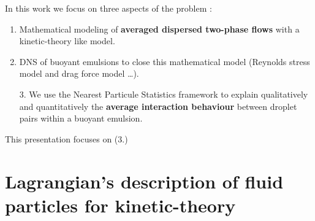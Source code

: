 \documentclass{sintefbeamer}
\begin{document}
\begin{frame}
  {In this work we focus on three aspects of the problem :}
  \Large
  \begin{enumerate}
    \item Mathematical modeling of \textbf{averaged dispersed two-phase flows} with a kinetic-theory like model. 

    \item DNS of buoyant emulsions to close this mathematical model (Reynolds stress model and drag force model \ldots). 
    \item[3.] We use the Nearest Particule Statistics framework to explain qualitatively and quantitatively the \textbf{average interaction behaviour} between droplet pairs within a buoyant emulsion. 
  \end{enumerate}
  This presentation focuses on (3.)
\end{frame}



\section{Lagrangian's description of fluid particles for kinetic-theory}
\section*{}
\end{document}
